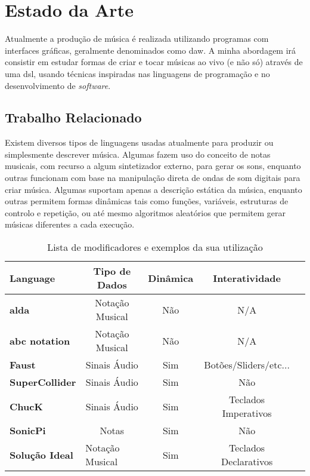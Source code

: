 \chapter{Estado da Arte}
Atualmente a produção de música é realizada utilizando programas com interfaces gráficas, geralmente denominados como \acrfull{daw}. A minha abordagem irá consistir em estudar formas de criar e tocar músicas ao vivo (e não só) através de uma \acrfull{dsl}, usando técnicas inspiradas nas linguagens de programação e no desenvolvimento de \textit{software}.

\section{Trabalho Relacionado}
Existem diversos tipos de linguagens usadas atualmente para produzir ou simplesmente descrever música. Algumas fazem uso do conceito de notas musicais, com recurso a algum sintetizador externo, para gerar os sons, enquanto outras funcionam com base na manipulação direta de ondas de som digitais para criar música. Algumas suportam apenas a descrição estática da música, enquanto outras permitem formas dinâmicas tais como funções, variáveis, estruturas de controlo e repetição, ou até mesmo algoritmos aleatórios que permitem gerar músicas diferentes a cada execução.

\begin{table}[h]
\centering
\def\arraystretch{1.3}
\begin{tabular}{|l|c|c|c|c|}
\hline
\textbf{Language}      & \textbf{Tipo de Dados}               & \textbf{Dinâmica} & \textbf{Interatividade} \\ \hline
\textbf{alda}          & Notação Musical                      & Não               & N/A                     \\ \hline
\textbf{abc notation}  & Notação Musical                      & Não               & N/A                     \\ \hline
\textbf{Faust}         & Sinais Áudio                         & Sim               & Botões/Sliders/etc...   \\ \hline
\textbf{SuperCollider} & Sinais Áudio                         & Sim               & Não                     \\ \hline
\textbf{ChucK}         & Sinais Áudio                         & Sim               & Teclados Imperativos        \\ \hline
\textbf{SonicPi}       & Notas                                & Sim               & Não                     \\ \hline \hline
\textbf{Solução Ideal} & \multicolumn{1}{l|}{Notação Musical} & Sim               & Teclados Declarativos   \\ \hline
\end{tabular}
\caption{Lista de modificadores e exemplos da sua utilização}
\label{tab:comparison}
\end{table}

